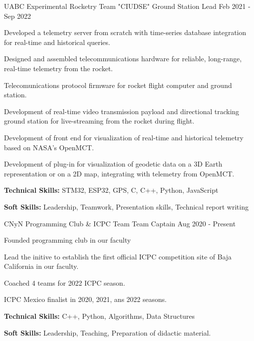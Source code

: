 \begin{cventries}
  \cventry
  {UABC Experimental Rocketry Team "CIUDSE"} %
  {Ground Station Lead} %
  {} %
  {Feb 2021 - Sep 2022} %
  {
    \begin{cvitems} %
      \item {Developed a telemetry server from scratch with time-series database integration for real-time and historical queries.}
      \item {Designed and assembled telecommunications hardware for reliable, long-range, real-time telemetry from the rocket.}
      \item {Telecomunications protocol firmware for rocket flight computer and ground station.}
      \item {Development of real-time video transmission payload  and directional tracking ground station for live-streaming   from the rocket during flight.}
      \item {Development of front end for visualization of real-time and historical telemetry based on NASA's OpenMCT.}
      \item {Development of plug-in for visualization of geodetic data on a 3D Earth representation or on a 2D map, integrating with telemetry from OpenMCT.}
      \item {\textbf{Technical Skills:} STM32, ESP32, GPS, C, C++, Python, JavaScript}
      \item {\textbf{Soft Skills:} Leadership, Teamwork, Presentation skills, Technical report writing}
    \end{cvitems}
  }


  \cventry
    {CNyN Programming Club \& ICPC Team} %
    {Team Captain} %
    {} %
    {Aug 2020 - Present} %
    {
      \begin{cvitems} %
        \item {Founded programming club in our faculty}
        \item {Lead the initive to establish the first official ICPC competition site of Baja California in our faculty.}
        \item {Coached 4 teams for 2022 ICPC season.}
        \item {ICPC Mexico finalist in 2020, 2021, ans 2022 seasons.}
        \item {\textbf{Technical Skills:} C++, Python, Algorithms, Data Structures}
        \item {\textbf{Soft Skills:} Leadership, Teaching, Preparation of didactic material.}
      \end{cvitems}
    }


\end{cventries}
